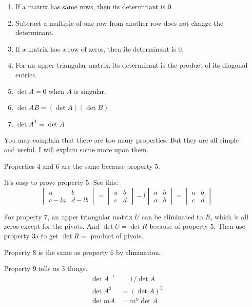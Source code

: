 \documentclass[12pt]{ctexart}
\begin{document}
\begin{enumerate}[start=4,label=(\arabic*)]
  \item If a matrix has same rows, then its determinant is 0.
  \item Subtract a multiple of one row from another row does not change the determinant.
  \item If a matrix has a row of zeros, then its determinant is 0.
  \item For an upper triangular matrix, its determinant is the product of its diagonal
entries.
  \item $\det A = 0$ when $A$ is singular.
  \item $\det AB = (\det A)(\det B)$
  \item $\det A^{T} = \det A$
\end{enumerate}

You may complain that there are too many properties. But they are all simple and useful.
I will explain some more upon them.

Properties 4 and 6 are the same because property 5.

It's easy to prove property 5. See this:
\[
  \begin{vmatrix}
    a & b \\
    c-la & d-lb
  \end{vmatrix} =
  \begin{vmatrix}
    a & b \\
    c & d
  \end{vmatrix} -
  l \begin{vmatrix}
    a & b \\
    a & b
  \end{vmatrix} =
  \begin{vmatrix}
    a & b \\
    c & d
  \end{vmatrix}
\]

For property 7, an upper triangular matrix $U$ can be eliminated to $R$, which is all
zeros except for the pivots. And $\det U = \det R$ because of property 5. Then use
property 3a to get $\det R = $ product of pivots.

Property 8 is the same as property 6 by elimination.

Property 9 tells us 3 things.
\begin{align*}
  \det A^{-1} &= 1/\det A \\
  \det A^2 &= (\det A)^2 \\
  \det mA &= m^n \det A
\end{align*}
\end{document}
